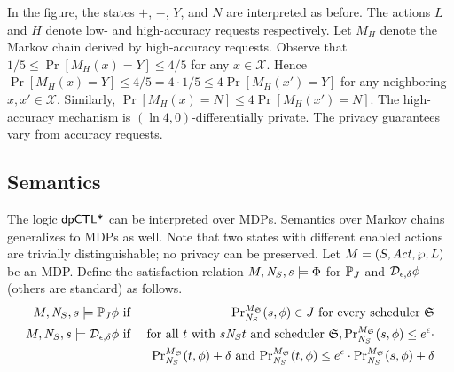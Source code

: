In the figure, the states $+$,
$-$, $Y$, and $N$ are interpreted as before. The actions $L$ and $H$
denote low- and high-accuracy requests respectively. Let $M_H$ denote
the Markov chain derived by high-accuracy requests.
Observe that $1/5 \leq \Pr[M_H(x) = Y] \leq 4/5$ for any $x
\in \mathcal{X}$. Hence $\Pr[M_H (x) = Y] \leq 4/5 = 4 \cdot 1/5 \leq
4 \Pr[M_H (x') = Y]$ for any neighboring $x, x' \in
\mathcal{X}$. Similarly, $\Pr[M_H (x) = N] \leq 4 \Pr[M_H (x') =
N]$. The high-accuracy mechanism is $(\ln 4,0)$-differentially private.
The privacy guarantees vary from accuracy requests.

\subsection{Semantics}
The logic $\dpCTLstar$ can be interpreted over MDPs. Semantics over Markov chains generalizes to MDPs as well. Note that two states with different enabled actions
are trivially distinguishable; no privacy can be preserved.
Let $M = (S, \Act, \wp, L)$ be an MDP. Define the satisfaction
relation $M, \neighbor{S}, s \models \Phi$ for $\PJ{J}$ and $\dpriv{\epsilon}{\delta} \phi$ (others are standard) as follows.
\begin{eqnarray*}
  M, \neighbor{S}, s \models \PJ{J} \phi
  & \textmd{ if } &
  \myPr{s}{M_{\scheduler{S}}}{\neighbor{S}}{\phi} \in J
  \textmd{ for every scheduler } \scheduler{S}\\
  M, \neighbor{S}, s \models \dpriv{\epsilon}{\delta} \phi
  & \textmd{ if } &
  \textmd{for all } t \textmd{ with } s \neighbor{S} t \textmd{ and
   scheduler } \scheduler{S},
   \myPr{s}{M_{\scheduler{S}}}{\neighbor{S}}{\phi} \leq
  e^{\epsilon} \cdot
   \\
  & &
   \myPr{t}{M_{\scheduler{S}}}{\neighbor{S}}{\phi} + \delta
   \textmd{ and }
   \myPr{t}{M_{\scheduler{S}}}{\neighbor{S}}{\phi} \leq e^{\epsilon} \cdot
   \myPr{s}{M_{\scheduler{S}}}{\neighbor{S}}{\phi} + \delta
\end{eqnarray*}

